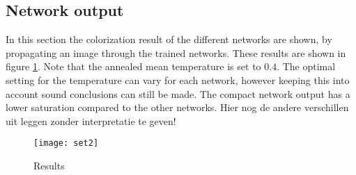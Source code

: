 \subsection{Network output}
In this section the colorization result of the different networks are shown, by propagating an image through the trained networks. These results are shown in figure \ref{fig:results}. Note that the annealed mean temperature is set to $0.4$. The optimal setting for the temperature can vary for each network, however keeping this into account sound conclusions can still be made. The compact network output has a lower saturation compared to the other networks. {\color{red} Hier nog de andere verschillen uit leggen zonder interpretatie te geven!}

\clearpage
\begin{figure}[h!]
	\centering
	\texttt{[image: set2]}
	\caption{Results}
	\label{fig:results}
\end{figure}




